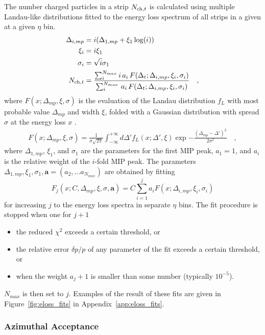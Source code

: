 \documentclass[11pt]{article}
\newcommand{\mult}[1][]{\ensuremath N_{\text{ch}#1}}
\newcommand{\figref}[1]{Figure~\ref{#1}}
\begin{document}
The number charged particles in a strip $\mult[,t]$ is calculated
using multiple Landau-like distributions fitted to the energy loss
spectrum of all strips in a given at a given $\eta$ bin.
\begin{align}
  \Delta_{i,mp} &= i (\Delta_{1,mp}+ \xi_1 \log(i))\nonumber\\
  \xi_i         &= i\xi_1\nonumber\\
  \sigma_i      &= \sqrt{i}\sigma_1\nonumber\\
  \mult[,t]     &= \frac{\sum_i^{N_{max}}
    i\,a_i\,F(\Delta_t;\Delta_{i,mp},\xi_i,\sigma_i)}{
    \sum_i^{N_{max}}\,a_i\,F(\Delta_t;\Delta_{i,mp},\xi_i,\sigma_i)}\quad,
\end{align}
where $F(x;\Delta_{mp},\xi,\sigma)$ is the evaluation of the Landau
distribution $f_L$ with most probable value $\Delta_{mp}$ and width
$\xi$, folded with a Gaussian distribution with spread $\sigma$ at the
energy loss $x$ \cite{nim:b1:16,phyrev:a28:615}.
\begin{align}
  \label{eq:energy_response}
  F(x;\Delta_{mp},\xi,\sigma) = \frac{1}{\sigma \sqrt{2 \pi}}
  \int_{-\infty}^{+\infty} d\Delta' f_{L}(x;\Delta',\xi)
  \exp{-\frac{(\Delta_{mp}-\Delta')^2}{2\sigma^2}}\quad,
\end{align}
where $\Delta_{1,mp}$, $\xi_1$, and $\sigma_1$ are the parameters for
the first MIP peak, $a_1=1$, and $a_i$ is the relative weight of the
$i$-fold MIP peak.  The parameters $\Delta_{1,mp}, \xi_1,
\sigma_1, \mathbf{a} = \left(a_2, \ldots a_{N_{max}}\right)$ are
obtained by fitting 
$$
F_j(x;C,\Delta_{mp},\xi,\sigma,\mathbf{a}) = C 
\sum_{i=1}^{j} a_i F(x;\Delta_{i,mp},\xi_{i},\sigma_i) 
$$
for increasing $j$ to the energy loss spectra in separate $\eta$ bins.
The fit procedure is stopped when one for $j+1$ 
\begin{itemize}
\item the reduced $\chi^2$ exceeds a certain threshold, or
\item the relative error $\delta p/p$ of any parameter of the fit
  exceeds a certain threshold, or 
\item when the weight $a_j+1$ is smaller than some number (typically
  $10^{-5}$). 
\end{itemize}
$N_{max}$ is then set to $j$.  Examples of the result of these fits
are given in \figref{fig:eloss_fits} in Appendix~\ref{app:eloss_fits}.

\subsubsection{Azimuthal Acceptance}
\end{document}
